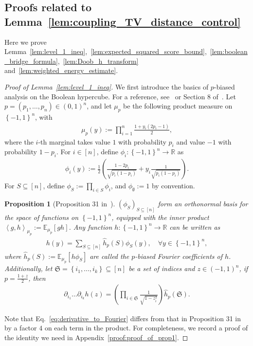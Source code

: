 \documentclass[11pt]{article}
\theoremstyle{named}
\theoremstyle{plain}
\newtheorem{proposition}{Proposition}
\newcommand{\defn}{:=}
\newcommand{\real}{\ensuremath{\mathbb{R}}}
\newcommand{\Exs}{\ensuremath{{\mathbb{E}}}}
\newcommand{\parenth}[1]{\left( #1 \right)}
\newcommand{\braces}[1]{\left\{ #1 \right \}}
\newcommand{\angles}[1]{\left\langle #1 \right \rangle}
\begin{document}
\subsection{Proofs related to Lemma~\ref{lem:coupling_TV_distance_control}}
\label{sub:proof_related_to_tv_lemma}
Here we prove Lemma~\ref{lem:level_1_ineq},~\ref{lem:expected_squared_score_bound},~\ref{lem:boolean_bridge_formula},~\ref{lem:Doob_h_transform} and~\ref{lem:weighted_energy_estimate}.

\begin{proof}[Proof of Lemma~\ref{lem:level_1_ineq}\label{proof_lem:level_1_ineq}]
  We first introduce the basics of $p$-biased analysis on the Boolean hypercube. For a reference, see~\cite{eldan2020concentration} or Section 8 of~\cite{o2014analysis}. Let $p = (p_1, \ldots, p_n) \in (0, 1)^n$, and let $\mu_p$ be the following product measure on $\braces{-1, 1}^n$, with
\begin{align*}
  \mu_p(y) \defn \prod_{i=1}^n \frac{1+y_i(2p_i - 1)}{2},
\end{align*}
where the $i$-th marginal takes value $1$ with probability $p_i$ and value $-1$ with probability $1-p_i$. For $i \in [n]$, define $\phi_i: \braces{-1, 1}^n \to \real$ as 
\begin{align}
  \label{eq:phi_basis_def}
  \phi_i(y) \defn \frac{1}{2} \parenth{\frac{1-2p_i}{\sqrt{p_i (1-p_i)}} + y_i \frac{1}{\sqrt{p_i (1-p_i)}} }.
\end{align}
For $S \subseteq [n]$, define $\phi_S \defn \prod_{i\in S} \phi_i$, and $\phi_\emptyset \defn 1$ by convention. 

\begin{proposition}[Proposition 31 in~\cite{eldan2020concentration}]
  \label{prop:p_biased_analysis}
  $(\phi_S)_{S \subseteq [n]}$ form an orthonormal basis for the space of functions on $\braces{-1, 1}^n$, equipped with the inner product $\angles{g, h}_{\mu_p} \defn \Exs_{\mu_p}[g h]$. Any function $h: \braces{-1, 1}^n \to \real$ can be written as 
  \begin{align*}
    h(y) = \sum_{S \subseteq [n]} \hat{h}_p(S) \phi_S(y), \quad \forall y \in \braces{-1, 1}^n,
  \end{align*}
  where $\hat{h}_p(S) \defn \Exs_{\mu_p}[h \phi_S]$ are called the $p$-biased Fourier coefficients of $h$. Additionally, let $\mathfrak{S} = \braces{i_1, \ldots, i_k} \subseteq [n]$ be a set of indices and $z \in (-1, 1)^n$, if $p = \frac{1+z}{2}$, then
  \begin{align}
    \label{eq:derivative_to_Fourier}
    \partial_{i_1} \ldots \partial_{i_k} h(z) = \parenth{\prod_{i\in \mathfrak{S}} \frac{1}{\sqrt{1-z_i^2}}} \hat{h}_p(\mathfrak{S}). 
  \end{align}
\end{proposition}
Note that Eq.~\eqref{eq:derivative_to_Fourier} differs from that in Proposition 31 in~\cite{eldan2020concentration} by a factor $4$ on each term in the product. For completeness, we record a proof of the identity we need in Appendix~\ref{proof:proof_of_prop1}.


\end{proof}
\end{document}

